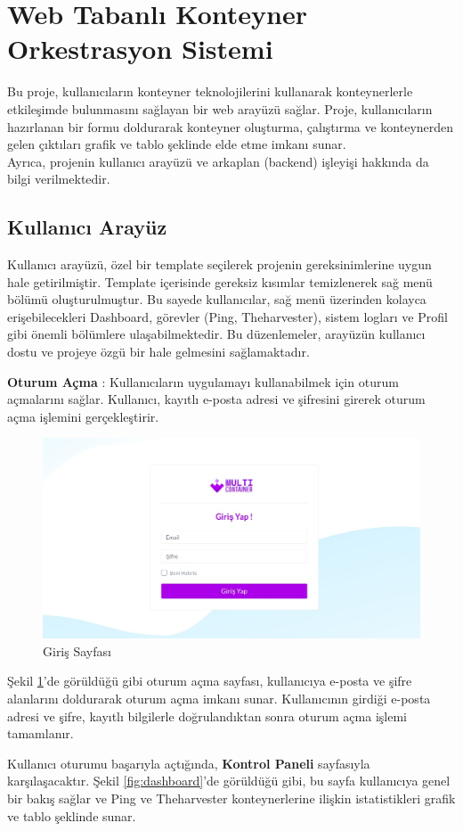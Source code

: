 \section{Web Tabanlı Konteyner Orkestrasyon Sistemi}\label{sec:project}
Bu proje, kullanıcıların konteyner teknolojilerini kullanarak konteynerlerle etkileşimde bulunmasını sağlayan bir web arayüzü sağlar. Proje, kullanıcıların hazırlanan bir formu doldurarak konteyner oluşturma, çalıştırma ve konteynerden gelen çıktıları grafik ve tablo şeklinde elde etme imkanı sunar.\\
Ayrıca, projenin kullanıcı arayüzü ve arkaplan (backend) işleyişi hakkında da bilgi verilmektedir.
\subsection{Kullanıcı Arayüz}
Kullanıcı arayüzü, özel bir template seçilerek projenin gereksinimlerine uygun hale getirilmiştir. Template içerisinde gereksiz kısımlar temizlenerek sağ menü bölümü oluşturulmuştur. Bu sayede kullanıcılar, sağ menü üzerinden kolayca erişebilecekleri Dashboard, görevler (Ping, Theharvester), sistem logları ve Profil gibi önemli bölümlere ulaşabilmektedir. Bu düzenlemeler, arayüzün kullanıcı dostu ve projeye özgü bir hale gelmesini sağlamaktadır.

\textbf{Oturum Açma} : Kullanıcıların uygulamayı kullanabilmek için oturum açmalarını sağlar. Kullanıcı, kayıtlı e-posta adresi ve şifresini girerek oturum açma işlemini gerçekleştirir.
\begin{figure}[ht]
  \centering
  \includegraphics[width=0.6\linewidth]{images/login.jpeg}
  \caption{Giriş Sayfası}
  \label{fig:login}
\end{figure}

Şekil \ref{fig:login}'de görüldüğü gibi oturum açma sayfası, kullanıcıya e-posta ve şifre alanlarını doldurarak oturum açma imkanı sunar. Kullanıcının girdiği e-posta adresi ve şifre, kayıtlı bilgilerle doğrulandıktan sonra oturum açma işlemi tamamlanır.

Kullanıcı oturumu başarıyla açtığında, \textbf{Kontrol Paneli} sayfasıyla karşılaşacaktır. Şekil \ref{fig:dashboard}'de görüldüğü gibi, bu sayfa kullanıcıya genel bir bakış sağlar ve Ping ve Theharvester konteynerlerine ilişkin istatistikleri grafik ve tablo şeklinde sunar.

